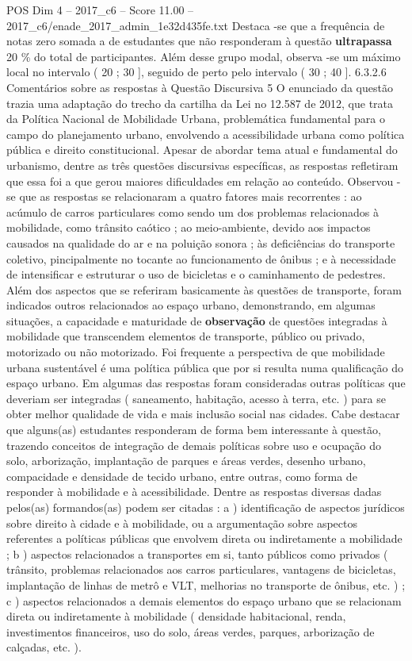 \begin{textsample}{POS Dim 4 – 2017\_c6 – Score 11.00 – 2017\_c6/enade\_2017\_admin\_1e32d435fe.txt}
Destaca -se que a frequência de notas zero somada a de estudantes que não responderam à questão \textbf{ultrapassa} 20 \% do total de participantes.
Além desse grupo modal, observa -se um máximo local no intervalo ( 20 ; 30 ], seguido de perto pelo intervalo ( 30 ; 40 ]. 6.3.2.6 Comentários sobre as respostas à Questão Discursiva 5 O enunciado da questão trazia uma adaptação do trecho da cartilha da Lei no 12.587 de 2012, que trata da Política Nacional de Mobilidade Urbana, problemática fundamental para o campo do planejamento urbano, envolvendo a acessibilidade urbana como política pública e direito constitucional.
Apesar de abordar tema atual e fundamental do urbanismo, dentre as três questões discursivas específicas, as respostas refletiram que essa foi a que gerou maiores dificuldades em relação ao conteúdo.
Observou -se que as respostas se relacionaram a quatro fatores mais recorrentes : ao acúmulo de carros particulares como sendo um dos problemas relacionados à mobilidade, como trânsito caótico ; ao meio-ambiente, devido aos impactos causados na qualidade do ar e na poluição sonora ; às deficiências do transporte coletivo, pincipalmente no tocante ao funcionamento de ônibus ; e à necessidade de intensificar e estruturar o uso de bicicletas e o caminhamento de pedestres.
Além dos aspectos que se referiram basicamente às questões de transporte, foram indicados outros relacionados ao espaço urbano, demonstrando, em algumas situações, a capacidade e maturidade de \textbf{observação} de questões integradas à mobilidade que transcendem elementos de transporte, público ou privado, motorizado ou não motorizado.
Foi frequente a perspectiva de que mobilidade urbana sustentável é uma política pública que por si resulta numa qualificação do espaço urbano.
Em algumas das respostas foram consideradas outras políticas que deveriam ser integradas ( saneamento, habitação, acesso à terra, etc. ) para se obter melhor qualidade de vida e mais inclusão social nas cidades.
Cabe destacar que alguns(as) estudantes responderam de forma bem interessante à questão, trazendo conceitos de integração de demais políticas sobre uso e ocupação do solo, arborização, implantação de parques e áreas verdes, desenho urbano, compacidade e densidade de tecido urbano, entre outras, como forma de responder à mobilidade e à acessibilidade.
Dentre as respostas diversas dadas pelos(as) formandos(as) podem ser citadas : a ) identificação de aspectos jurídicos sobre direito à cidade e à mobilidade, ou a argumentação sobre aspectos referentes a políticas públicas que envolvem direta ou indiretamente a mobilidade ; b ) aspectos relacionados a transportes em si, tanto públicos como privados ( trânsito, problemas relacionados aos carros particulares, vantagens de bicicletas, implantação de linhas de metrô e VLT, melhorias no transporte de ônibus, etc. ) ; c ) aspectos relacionados a demais elementos do espaço urbano que se relacionam direta ou indiretamente à mobilidade ( densidade habitacional, renda, investimentos financeiros, uso do solo, áreas verdes, parques, arborização de calçadas, etc. ).

\end{textsample}
